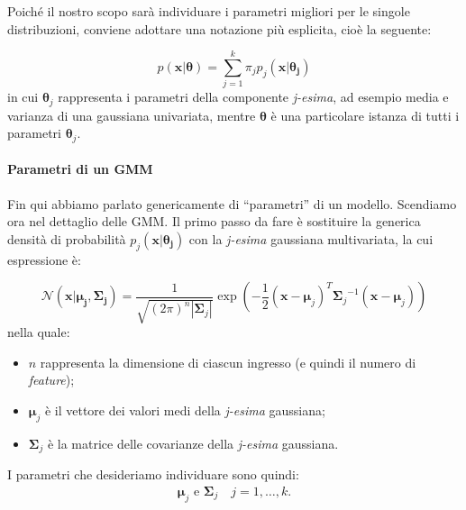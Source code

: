 Poiché il nostro scopo sarà individuare i parametri migliori per le singole distribuzioni, conviene adottare una notazione più esplicita, cioè la seguente:

\begin{equation*}
p(\mathbf{x}|\boldsymbol{\theta}) = \sum_{j=1}^k \pi_j p_j(\mathbf{x} | \boldsymbol{\theta_j})
\end{equation*}
in cui $\boldsymbol\theta_j$ rappresenta i parametri della componente \emph{j-esima}, ad esempio media e varianza di una gaussiana univariata, mentre $\boldsymbol\theta$ è una particolare istanza di tutti i parametri $\boldsymbol\theta_j$.

\paragraph{Parametri di un GMM}
Fin qui abbiamo parlato genericamente di ``parametri'' di un modello. Scendiamo ora nel dettaglio delle GMM. Il primo passo da fare è sostituire la generica densità di probabilità $p_j(\mathbf{x} | \boldsymbol{\theta_j})$ con la \emph{j-esima} gaussiana multivariata, la cui espressione è:

\begin{equation*}
\mathcal{N}(\mathbf{x} | \boldsymbol{\mu_j}, \boldsymbol{\Sigma_j}) = \frac{1}{\sqrt{(2\pi)^{n} |\boldsymbol\Sigma_j|}} \exp\left(-\frac{1}{2}({\mathbf x}-{\boldsymbol\mu_j})^T{\boldsymbol\Sigma_j}^{-1}({\mathbf x}-{\boldsymbol\mu_j})
\right)
\end{equation*}
nella quale:
\begin{itemize}
\item $n$ rappresenta la dimensione di ciascun ingresso (e quindi il numero di \emph{feature});
\item $\boldsymbol\mu_j$ è il vettore dei valori medi della \emph{j-esima} gaussiana;
\item $\boldsymbol\Sigma_j$ è la matrice delle covarianze della \emph{j-esima} gaussiana.
\end{itemize}
I parametri che desideriamo individuare sono quindi:
\begin{gather*}
\boldsymbol\mu_j \text{~e~} \boldsymbol\Sigma_j \quad j=1, \dots, k.
\end{gather*}

